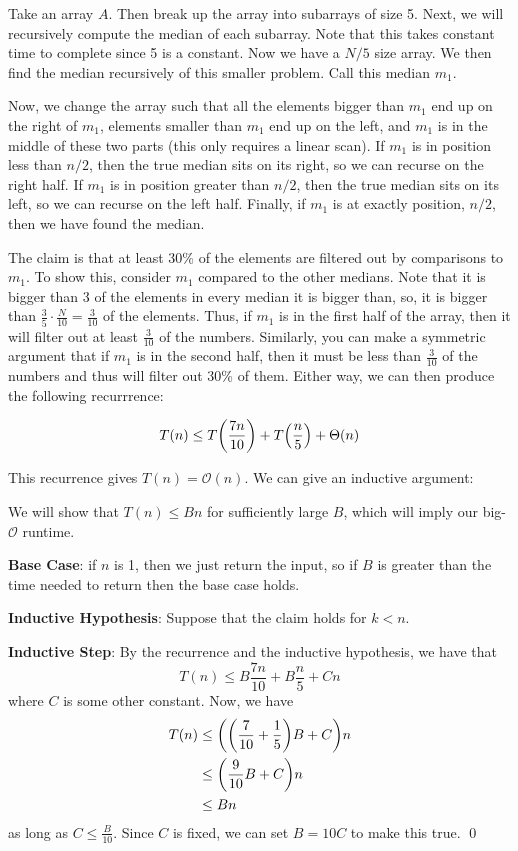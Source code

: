 \begin{algothm} 
    Take an array $A$. Then break up the array into subarrays of size 5.
    Next, we will recursively compute the median of each subarray. Note that this takes constant
    time to complete since 5 is a constant. Now we have a $N / 5$ size array. We then find the median recursively of this smaller problem.
    Call this median $m_1$.

    Now, we change the array such that all the elements bigger than $m_1$ end up on the right of $m_1$,
    elements smaller than $m_1$ end up on the left, and $m_1$ is in the middle of these two parts (this only requires a linear scan).
    If $m_1$ is in position
    less than $n / 2$, then the true median sits on its right, so we can recurse on the right half.
    If $m_1$ is in position greater than $n / 2$, then the true median sits on its left, so we can recurse on the left half.
    Finally, if $m_1$ is at exactly position, $n/2$, then we have found the median.

    The claim is that at least 30\% of the elements are filtered out by comparisons to $m_1$. To show this,
    consider $m_1$ compared to the other medians. Note that it is bigger than 3 of the elements in every median it is bigger than,
    so, it is bigger than $\frac{3}{5} \cdot \frac{N}{10} = \frac{3}{10}$ of the elements. Thus, if $m_1$ is in the first half of the array,
    then it will filter out at least $\frac{3}{10}$ of the numbers. Similarly, you can make a symmetric argument that if $m_1$ is in the second half,
    then it must be less than $\frac{3}{10}$ of the numbers and thus will filter out 30\% of them. Either way, we can then produce the following recurrrence:

    \[ T(n) \leq T\qty(\frac{7n}{10}) + T\qty(\frac{n}{5}) + \Theta(n) \]

    This recurrence gives $T(n) = \mathcal{O}(n)$. We can give an inductive argument:
    \begin{proof*}
        We will show that $T(n) \leq Bn$ for sufficiently large $B$, which will imply our big-$\mathcal{O}$ runtime.

        \textbf{Base Case}: if $n$ is 1, then we just return the input, so if $B$ is greater than the time needed to return
        then the base case holds.

        \textbf{Inductive Hypothesis}: Suppose that the claim holds for $k < n$.
        
        \textbf{Inductive Step}: By the recurrence and the inductive hypothesis, we have that
        \[T(n) \leq B \frac{7n}{10} + B \frac{n}{5} + Cn\]
        where $C$ is some other constant. Now, we have
        \begin{align*}
            T(n) &\leq \qty(\qty(\frac{7}{10} + \frac{1}{5})B + C)n \\
            &\leq \qty(\frac{9}{10}B + C)n \\
            &\leq Bn
        \end{align*}
        as long as $C \leq \frac{B}{10}$. Since $C$ is fixed, we can
        set $B = 10C$ to make this true. \qed
    \end{proof*}

\end{algothm}

